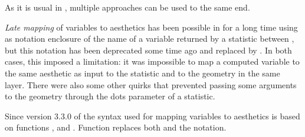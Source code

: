 \documentclass[krantz2]{krantz}\usepackage{knitr}
\begin{document}
\begin{explainbox}
As it is usual in \Rlang, multiple approaches can be used to the same end.
\end{explainbox}

\begin{explainbox}
\emph{Late mapping} of variables to aesthetics has been possible in  for a long time using as notation enclosure of the name of a variable returned by a statistic between , but this notation has been deprecated some time ago and replaced by . In both cases, this imposed a limitation: it was impossible to map a computed variable to the same aesthetic as input to the statistic and to the geometry in the same layer. There were also some other quirks that prevented passing some arguments to the geometry through the dots  parameter of a statistic.

Since version 3.3.0 of  the syntax used for mapping variables to aesthetics is based on functions ,  and . Function  replaces both  and the  notation.
\end{explainbox}
\end{document}
